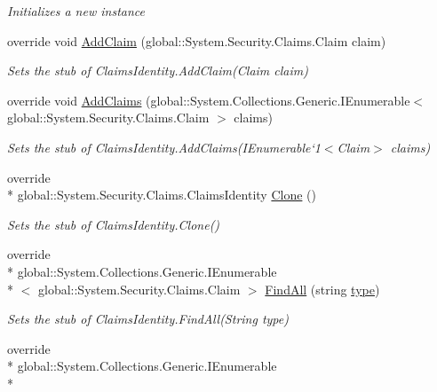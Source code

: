 \begin{DoxyCompactItemize}
\begin{DoxyCompactList}\small\item\em Initializes a new instance\end{DoxyCompactList}\item 
override void \hyperlink{class_system_1_1_security_1_1_claims_1_1_fakes_1_1_stub_claims_identity_aaa2208e72f2dced0db67a6c01ccc588d}{Add\-Claim} (global\-::\-System.\-Security.\-Claims.\-Claim claim)
\begin{DoxyCompactList}\small\item\em Sets the stub of Claims\-Identity.\-Add\-Claim(\-Claim claim)\end{DoxyCompactList}\item 
override void \hyperlink{class_system_1_1_security_1_1_claims_1_1_fakes_1_1_stub_claims_identity_ae9241b687fa42ec912f14b247bfe98e7}{Add\-Claims} (global\-::\-System.\-Collections.\-Generic.\-I\-Enumerable$<$ global\-::\-System.\-Security.\-Claims.\-Claim $>$ claims)
\begin{DoxyCompactList}\small\item\em Sets the stub of Claims\-Identity.\-Add\-Claims(I\-Enumerable`1$<$Claim$>$ claims)\end{DoxyCompactList}\item 
override \\*
global\-::\-System.\-Security.\-Claims.\-Claims\-Identity \hyperlink{class_system_1_1_security_1_1_claims_1_1_fakes_1_1_stub_claims_identity_afaff0be69788bab436cfd0ee5cbd4c31}{Clone} ()
\begin{DoxyCompactList}\small\item\em Sets the stub of Claims\-Identity.\-Clone()\end{DoxyCompactList}\item 
override \\*
global\-::\-System.\-Collections.\-Generic.\-I\-Enumerable\\*
$<$ global\-::\-System.\-Security.\-Claims.\-Claim $>$ \hyperlink{class_system_1_1_security_1_1_claims_1_1_fakes_1_1_stub_claims_identity_aa08f5f837327b143248e965957c85514}{Find\-All} (string \hyperlink{jquery-1_810_82-vsdoc_8js_a3940565e83a9bfd10d95ffd27536da91}{type})
\begin{DoxyCompactList}\small\item\em Sets the stub of Claims\-Identity.\-Find\-All(\-String type)\end{DoxyCompactList}\item 
override \\*
global\-::\-System.\-Collections.\-Generic.\-I\-Enumerable\\*

\end{DoxyCompactItemize}
